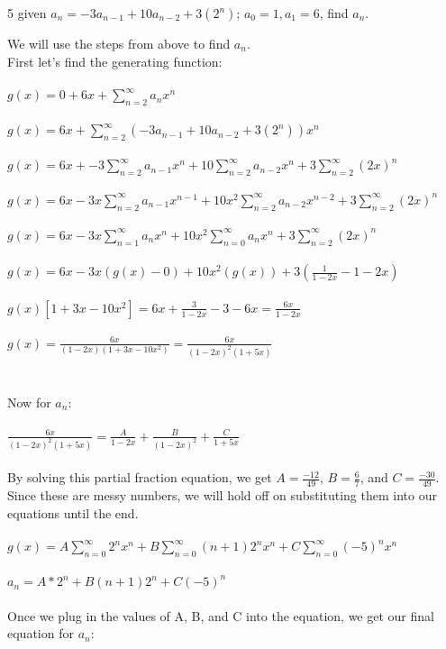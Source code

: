 \documentclass[11pt,twosided]{article}
\begin{document}
\begin{problem} 5
given $a_n = -3a_{n-1} + 10a_{n-2} + 3(2^n)$; $a_0 = 1, a_1 = 6$, find $a_n$.
\end{problem}
\begin{solution}
We will use the steps from above to find $a_n$. \\

\noindent
First let's find the generating function: \\\\
$g(x) = 0 + 6x + \sum_{n = 2}^\infty a_n x^n$ \\\\
$g(x) = 6x + \sum_{n = 2}^\infty(-3a_{n-1} + 10a_{n-2} + 3(2^n))x^n$\\\\
$g(x) = 6x + -3\sum_{n = 2}^\infty a_{n-1}x^n + 10\sum_{n = 2}^\infty a_{n-2}x^n + 3\sum_{n = 2}^\infty (2x)^n$\\\\
$g(x) =  6x - 3x\sum_{n = 2}^\infty a_{n-1}x^{n-1} + 10x^2\sum_{n = 2}^\infty a_{n-2}x^{n-2} + 3\sum_{n = 2}^\infty(2x)^n$\\\\
$g(x) =  6x - 3x\sum_{n = 1}^\infty a_{n}x^{n} + 10x^2\sum_{n = 0}^\infty a_{n}x^{n} + 3\sum_{n = 2}^\infty(2x)^n$\\\\
$g(x) =  6x - 3x(g(x) - 0) + 10x^2(g(x)) + 3(\frac{1}{1-2x}-1-2x)$\\\\
$g(x)[1+3x-10x^2]=6x+\frac{3}{1-2x}-3-6x=\frac{6x}{1-2x}$ \\\\
$g(x)=\frac{6x}{(1-2x)(1+3x-10x^2)}=\frac{6x}{(1-2x)^2(1+5x)}$ \\\\
\noindent \\
Now for $a_n$:\\\\
$\frac{6x}{(1-2x)^2(1+5x)} = \frac{A}{1-2x}+\frac{B}{(1-2x)^2}+\frac{C}{1+5x}$\\\\
\noindent
By solving this partial fraction equation, we get $A=\frac{-12}{49}$, $B=\frac{6}{7}$, and $C=\frac{-30}{49}$. Since these are messy numbers, we will hold off on substituting them into our equations until the end. \\\\
$g(x) =  A\sum_{n = 0}^\infty 2^n x^n + B\sum_{n = 0}^\infty (n+1)2^n x^{n} + C\sum_{n = 0}^\infty(-5)^n x^n$\\\\
$a_n = A*2^n + B(n+1)2^n + C(-5)^n$ \\\\
\noindent
Once we plug in the values of A, B, and C into the equation, we get our final equation for $a_n$: \\\\

\end{solution} \\
\end{document}
